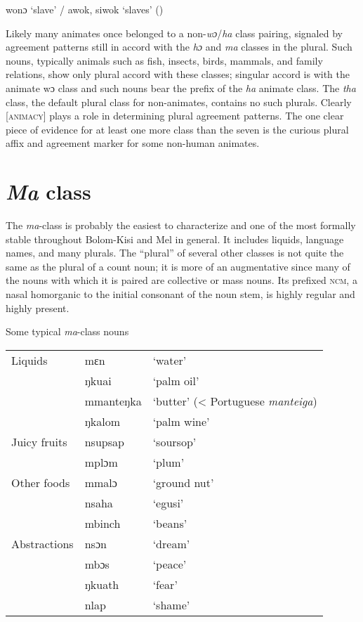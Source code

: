 \ex  wonɔ ‘slave' / awok, siwok ‘slaves' (\citealt{Sumner1921})\footnotemark
{}
\z
\z

Likely many animates once belonged to a non-\textit{wɔ}/\textit{ha} class pairing, signaled by agreement patterns still in accord with the \textit{hɔ} and \textit{ma} classes in the plural. Such nouns, typically animals such as fish, insects, birds, mammals, and family relations, show only plural accord with these classes; singular accord is with the animate wɔ class and such nouns bear the prefix of the \textit{ha} animate class. The \textit{tha} class, the default plural class for non-animates, contains no such plurals. Clearly [\textsc{animacy}] plays a role in determining plural agreement patterns. The one clear piece of evidence for at least one more class than the seven is the curious plural affix and agreement marker for some non-human animates.

\section{\textit{Ma} class}
\hypertarget{Toc115517793}{}\label{sec:5.6}
The \textit{ma}{}-class is probably the easiest to characterize and one of the most formally stable throughout Bolom-Kisi and Mel in general. It includes liquids, language names, and many plurals. The “plural” of several other classes is not quite the same as the plural of a count noun; it is more of an augmentative since many of the nouns with which it is paired are collective or mass nouns. Its prefixed \textsc{ncm}, a nasal homorganic to the initial consonant of the noun stem, is highly regular and highly present.

\ea%
    \label{ex:147}
    Some typical \textit{ma}{}-class nouns\\
    \begin{tabular}{lll}
    Liquids & mɛn & ‘water'\\
            & ŋkuai & ‘palm oil'\\
            & mmanteŋka & ‘butter' (< Portuguese \textit{manteiga})\\
            & ŋkalom & ‘palm wine'\\
Juicy fruits & nsupsap & ‘soursop'\\
             & mplɔm & ‘plum'\\
Other foods & mmalɔ & ‘ground nut'\\
            & nsaha & ‘egusi'\\
            & mbinch & ‘beans'\\
Abstractions & nsɔn & ‘dream'\\
             & mbɔs & ‘peace'\\
             & ŋkuath & ‘fear'\\
            & nlap & ‘shame'\\
\end{tabular}
\z

